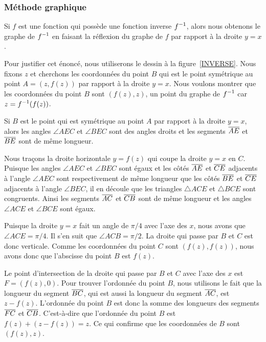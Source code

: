 {\subsubsection{Méthode graphique}

\begin{meth}
Si $f$ est une fonction qui possède une fonction inverse $\displaystyle f^{-1}$,
alors nous obtenons le graphe de $\displaystyle f^{-1}$ en faisant la réflexion du
graphe de $f$ par rapport à la droite $y=x$.
\end{meth}


\begin{rmk}[\theory]
Pour justifier cet énoncé, nous utiliserons le dessin à la
figure~\ref{INVERSE}.
Nous fixons $z$ et cherchons les coordonnées du point $B$ qui est
le point symétrique au point $A = (z,f(z))$ par rapport à la droite
$y=x$.  Nous voulons montrer que les coordonnées du point $B$ sont
$(f(z),z)$, un point du graphe de $\displaystyle f^{-1}$ car $\displaystyle z = f^{-1}(f(z))$.

Si $B$ est le point qui est symétrique au point $A$ par rapport à la
droite $y=x$, alors les angles $\angle AEC$ et $\angle BEC$ sont des
angles droits et les segments $\overline{AE}$ et $\overline{BE}$ sont de même
longueur.

Nous traçons la droite horizontale $y = f(z)$ qui coupe la droite $y=x$ en
$C$.  Puisque les angles $\angle AEC$ et $\angle BEC$ sont égaux et les
côtés $\overline{AE}$ et $\overline{CE}$ adjacents à l'angle $\angle AEC$ sont
respectivement de même longueur que les côtés $\overline{BE}$ et $\overline{CE}$
adjacents à l'angle $\angle BEC$, il en découle que les triangles
$\triangle ACE$ et $\triangle BCE$ sont congruents.  Ainsi les
segments $\overline{AC}$ et $\overline{CB}$ sont de même longueur et les angles
$\angle ACE$ et $\angle BCE$ sont égaux.

Puisque la droite $y=x$ fait un angle de $\pi/4$ avec l'axe des $x$,
nous avons que $\angle ACE = \pi/4$.  Il s'en suit que $\angle ACB = \pi/2$.
La droite qui passe par $B$ et $C$ est donc verticale.  Comme les
coordonnées du point $C$ sont $(f(z),f(z))$, nous avons donc que
l'abscisse du point $B$ est $f(z)$.

Le point d'intersection de la droite qui passe par $B$ et $C$ avec
l'axe des $x$ est $F=(f(z),0)$.  Pour trouver l'ordonnée du point $B$,
nous utilisons le fait que la longueur du segment $\overline{BC}$, qui est
aussi la longueur du segment $\overline{AC}$, est $z-f(z)$.
L'ordonnée du point $B$ est donc la somme des longueurs des segments
$\overline{FC}$ et $\overline{CB}$.  C'est-à-dire que l'ordonnée du point $B$
est $f(z) + (z - f(z)) = z$.  Ce qui confirme que les coordonnées de
$B$ sont $(f(z),z)$.
\end{rmk}

}
